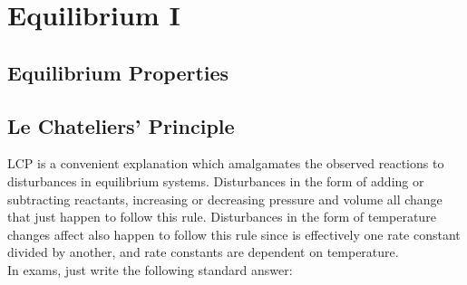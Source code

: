 \documentclass[../main]{subfiles}
\begin{document}
\section{Equilibrium I}

\subsection{Equilibrium Properties}

\subsection{Le Chateliers' Principle}


	LCP is a convenient explanation which amalgamates the observed reactions to disturbances in equilibrium systems. Disturbances in the form of adding or subtracting reactants, increasing or decreasing pressure and volume all change  that just happen to follow this rule. Disturbances in the form of temperature changes affect  also happen to follow this rule since  is effectively one rate constant divided by another, and rate constants are dependent on temperature. \\

	In exams, just write the following standard answer: \\
\end{document}

